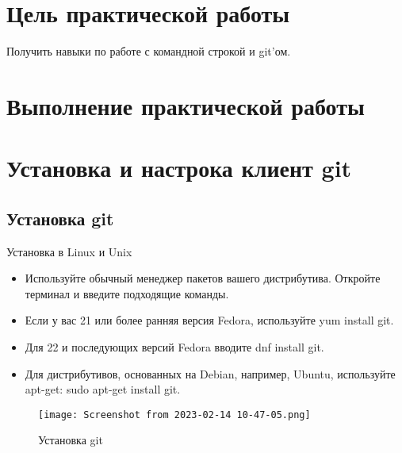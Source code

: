 \graphicspath{{/home/arbon/Pictures/Screenshots/}} %
\section*{\LARGE{Цель практической работы}}
Получить навыки по работе с командной строкой и git’ом.
\newpage

\section*{\LARGE{Выполнение практической работы}}
\section{Установка и настрока клиент git}
\subsection{Установка git}
Установка в Linux и Unix
\begin{itemize}
	\item Используйте обычный менеджер пакетов вашего дистрибутива.
		Откройте терминал и введите подходящие команды.
	\item Если у вас 21 или более ранняя версия Fedora,
		используйте yum install git.
	\item Для 22 и последующих версий Fedora вводите dnf install git.
	\item Для дистрибутивов, основанных на Debian, например, Ubuntu,
		используйте apt-get: sudo apt-get install git.
\end{itemize}
\begin{figure}[hp]
	\centering
	\texttt{[image: Screenshot from 2023-02-14 10-47-05.png]}
	\caption{Установка git}
	\label{fig:git:install}
\end{figure}


